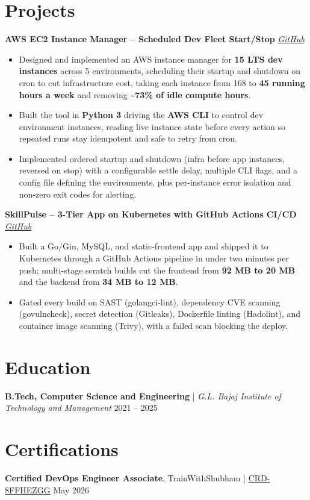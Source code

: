 \documentclass[10pt, letterpaper]{article}
\begin{document}
\section*{Projects}
\vspace{0pt}
\textbf{AWS EC2 Instance Manager -- Scheduled Dev Fleet Start/Stop} \hfill \href{https://github.com/shivang21007/aws-ec2-instance-manager}{\textit{GitHub}}
\begin{itemize}
    \item Designed and implemented an AWS instance manager for \textbf{15 LTS dev instances} across 5 environments, scheduling their startup and shutdown on cron to cut infrastructure cost, taking each instance from 168 to \textbf{45 running hours a week} and removing \textbf{\textasciitilde 73\% of idle compute hours}.
    \item Built the tool in \textbf{Python 3} driving the \textbf{AWS CLI} to control dev environment instances, reading live instance state before every action so repeated runs stay idempotent and safe to retry from cron.
    \item Implemented ordered startup and shutdown (infra before app instances, reversed on stop) with a configurable settle delay, multiple CLI flags, and a config file defining the environments, plus per-instance error isolation and non-zero exit codes for alerting.
\end{itemize}

\vspace{2pt}
\textbf{SkillPulse -- 3-Tier App on Kubernetes with GitHub Actions CI/CD} \hfill \href{https://github.com/shivang21007/github-actions-kubernetes-masterclass}{\textit{GitHub}}
\begin{itemize}
    \item Built a Go/Gin, MySQL, and static-frontend app and shipped it to Kubernetes through a GitHub Actions pipeline in under two minutes per push; multi-stage scratch builds cut the frontend from \textbf{92 MB to 20 MB} and the backend from \textbf{34 MB to 12 MB}.
    \item Gated every build on SAST (golangci-lint), dependency CVE scanning (govulncheck), secret detection (Gitleaks), Dockerfile linting (Hadolint), and container image scanning (Trivy), with a failed scan blocking the deploy.
\end{itemize}

\section*{Education}
\vspace{0pt}
\textbf{B.Tech, Computer Science and Engineering} \;|\; \textit{G.L. Bajaj Institute of Technology and Management} \hfill 2021 -- 2025

\section*{Certifications}
\vspace{0pt}
\textbf{Certified DevOps Engineer Associate}, TrainWithShubham \;|\; \href{https://credentials.certdirectory.io/verify/CRD-8FFHEZGG}{CRD-8FFHEZGG} \hfill May 2026
\end{document}
